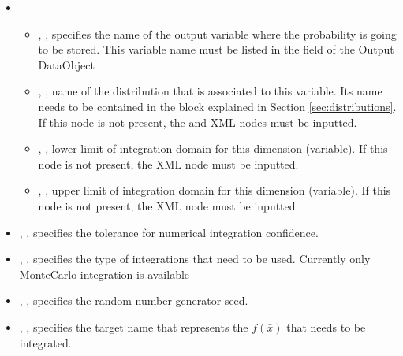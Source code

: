 \begin{itemize}
\item \variableDescription
 \variableChildIntro
 \begin{itemize}
     \item  {}, , specifies the name of the output variable where the probability is going to be stored.
               \nb This variable name must be listed in the  field of the Output DataObject
    \item   {}, , name of the distribution that is associated to this variable.
              Its name needs to be contained in the  block explained
              in Section \ref{sec:distributions}. If this node is not present, the  
              and   XML nodes must be inputted.
   \item   {}, , lower limit of integration domain for this dimension (variable).
               If this node is not present, the   XML node must be inputted.
   \item   {}, , upper limit of integration domain for this dimension (variable).
               If this node is not present, the   XML node must be inputted.
  \end{itemize}

    \item  {}, , specifies the tolerance for
               numerical integration confidence.
     \item  {}, , specifies the type of integrations that
                need to be used. Currently only MonteCarlo integration is available
     \item  {}, , specifies the random number generator seed.
     \item  {}, , specifies the target name that represents
                the $f\left ( \bar{x} \right )$ that needs to be integrated.
\end{itemize}

